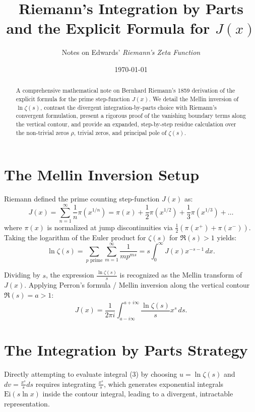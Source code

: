 \documentclass[11pt,a4paper]{article}
\title{\textbf{Riemann's Integration by Parts and the Explicit Formula for $J(x)$}}
\author{Notes on Edwards' \textit{Riemann's Zeta Function}}
\date{\today}
\theoremstyle{definition}
\begin{document}
\maketitle

\begin{abstract}
A comprehensive mathematical note on Bernhard Riemann's 1859 derivation of the explicit formula for the prime step-function $J(x)$. We detail the Mellin inversion of $\ln \zeta(s)$, contrast the divergent integration-by-parts choice with Riemann's convergent formulation, present a rigorous proof of the vanishing boundary terms along the vertical contour, and provide an expanded, step-by-step residue calculation over the non-trivial zeros $\rho$, trivial zeros, and principal pole of $\zeta(s)$.
\end{abstract}

\section{The Mellin Inversion Setup}

Riemann defined the prime counting step-function $J(x)$ as:
\begin{equation}
    J(x) = \sum_{n=1}^{\infty} \frac{1}{n} \pi(x^{1/n}) = \pi(x) + \frac{1}{2}\pi(x^{1/2}) + \frac{1}{3}\pi(x^{1/3}) + \dots
\end{equation}
where $\pi(x)$ is normalized at jump discontinuities via $\frac{1}{2}(\pi(x^+) + \pi(x^-))$. Taking the logarithm of the Euler product for $\zeta(s)$ for $\Re(s) > 1$ yields:
\begin{equation}
    \ln \zeta(s) = \sum_{p \text{ prime}} \sum_{m=1}^{\infty} \frac{1}{m p^{ms}} = s \int_{0}^{\infty} J(x) x^{-s-1} \, dx.
\end{equation}

Dividing by $s$, the expression $\frac{\ln \zeta(s)}{s}$ is recognized as the Mellin transform of $J(x)$. Applying Perron's formula / Mellin inversion along the vertical contour $\Re(s) = a > 1$:
\begin{equation}
    J(x) = \frac{1}{2\pi i} \int_{a - i\infty}^{a + i\infty} \frac{\ln \zeta(s)}{s} x^s \, ds.
\end{equation}

\section{The Integration by Parts Strategy}

Directly attempting to evaluate integral (3) by choosing $u = \ln \zeta(s)$ and $dv = \frac{x^s}{s} ds$ requires integrating $\frac{x^s}{s}$, which generates exponential integrals $\mathrm{Ei}(s \ln x)$ inside the contour integral, leading to a divergent, intractable representation.
\end{document}

